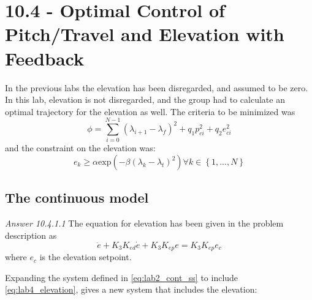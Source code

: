 \documentclass[../main.tex]{subfiles}
\begin{document}
\section{10.4 - Optimal Control of Pitch/Travel and Elevation with Feedback}
In the previous labs the elevation has been disregarded, and assumed to be zero. In this lab, elevation is not disregarded, and the group had to calculate an optimal trajectory for the elevation as well. The criteria to be minimized was
\begin{equation}\label{eq:lab4_cost_func}
	\phi = \sum_{i=0}^{N-1} (\lambda_{i + 1} - \lambda_f)^{2} + q_1 p_{ci}^2 + q_2 e_{ci} ^2
\end{equation}
and the constraint on the elevation was:
\begin{equation}\label{eq:lab4_elevation_constraint}
	e_k \geq \alpha \text{exp}\left( -\beta (\lambda_k - \lambda_t)^2\right) \forall k \in \left\lbrace 1,...,N\right\rbrace 
\end{equation}

\subsection{The continuous model}
\textit{Answer 10.4.1.1}
The equation for elevation has been given in the problem description as
\begin{equation}\label{eq:lab4_elevation}
	\ddot{e} + K_3K_{ed}\dot{e} + K_3K_{ep}e = K_3K_{ep}e_c
\end{equation}
where $ e_c $ is the elevation setpoint.

Expanding the system defined in \cref{eq:lab2_cont_ss} to include \cref{eq:lab4_elevation}, gives a new system that includes the elevation:
\end{document}
